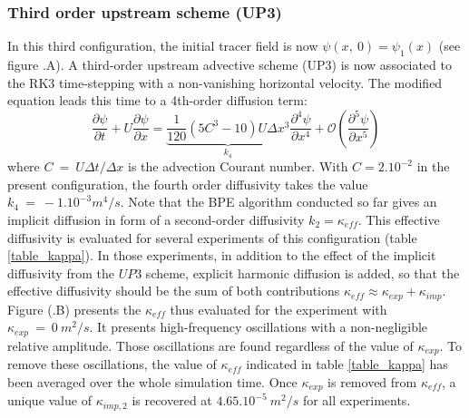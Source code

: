 \subsubsection{Third order upstream scheme (UP3)}
In this third configuration, the initial tracer field is now $\psi(x,\ 0)=\psi_1(x)$ (see figure .A).%
A third-order upstream advective scheme (UP3) is now associated to the RK3 time-stepping with a non-vanishing horizontal velocity. The modified equation leads this time to a 4th-order diffusion term:
\begin{equation}
\frac{\partial \psi}{\partial t}+U \frac{\partial \psi}{\partial x} = \underbrace{\frac{1}{120}(5 C^3-10) U \Delta x^3}_{k_4}  \frac{\partial^4 \psi}{\partial x^4} + \mathcal{O}(\frac{\partial^5 \psi}{\partial x^5})
\end{equation}
where $C\ =\ U\Delta t/\Delta x$ is the advection Courant number. With $C=2 . 10^{-2}$ in the present configuration, the fourth order diffusivity takes the value $k_4\ =\ -1.10^{-3} m^4/s$. Note that the BPE algorithm conducted so far gives an implicit diffusion in form of a second-order diffusivity $k_2=\kappa_{eff}$.
\color{red}This effective diffusivity is evaluated for several experiments of this configuration (table \ref{table_kappa}). In those experiments, in addition to the effect of the implicit diffusivity from the $UP3$ scheme, explicit harmonic diffusion is added, so that the effective diffusivity should be the sum of both contributions $\kappa_{eff} \approx \kappa_{exp} + \kappa_{imp}$.
Figure (.B) presents the $\kappa_{eff}$ thus evaluated for the experiment with $\kappa_{exp}\ =\ 0 \ m^2/s$. It presents high-frequency oscillations with a non-negligible relative amplitude. Those oscillations are found regardless of the value of $\kappa_{exp}$. \color{blue} To remove these oscillations, the value of $\kappa_{eff}$ indicated in table \ref{table_kappa} has been averaged over the whole simulation time. \color{red} Once $\kappa_{exp}$ is removed from $\kappa_{eff}$, a unique value of $\kappa_{imp,2}$ is recovered at $4.65.10^{-5}\ m^2/s$ for all experiments.


